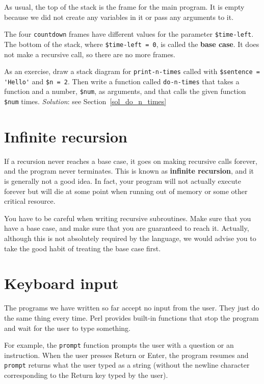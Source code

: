 As usual, the top of the stack is the frame for the main 
program.
It is empty because we did not create any variables in 
it or pass any arguments to it.

The four {\tt countdown} frames have different values for the
parameter {\tt \$time-left}.  The bottom of the stack, where {\tt \$time-left = 0}, is
called the {\bf base case}.  It does not make a recursive call, so
there are no more frames.

As an exercise, draw a stack diagram for \verb"print-n-times" 
called with
\verb"$sentence = 'Hello'" and {\tt \$n = 2}.
Then write a function called \verb"do-n-times" that takes a function
and a number, {\tt \$num}, as arguments, and that calls
the given function {\tt \$num} times.
\label{do_n_times}
\emph{Solution}: see Section~\ref{sol_do_n_times}


\section{Infinite recursion}


If a recursion never reaches a base case, it goes on making
recursive calls forever, and the program never terminates.  This is
known as {\bf infinite recursion}, and it is generally not
a good idea. In fact, your program will not actually execute forever but will die at some point when running out of memory or some other critical resource.

You have to be careful when writing recursive subroutines. Make sure that you have a base case, and make sure that you are guaranteed to reach it. Actually, although this is not 
absolutely required by the language, we would advise you to 
take the good habit of treating the base case first.


\section{Keyboard input}

The programs we have written so far accept no input from the user. They just do the same thing every time. Perl provides built-in functions that stop the program and
wait for the user to type something. 

For example, the {\tt prompt} function prompts the user with 
a question or an instruction. When the user presses 
{\sf Return} or {\sf Enter}, the program resumes and 
\verb"prompt" returns what the user typed as a string 
(without the newline character corresponding to the 
{\sf Return} key typed by the user).

